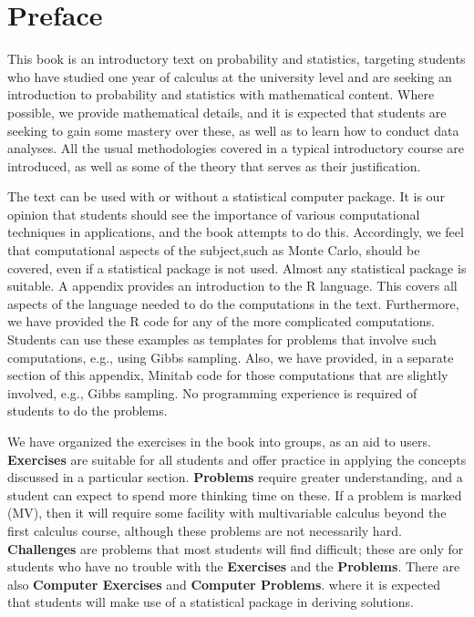\chapter{Preface}\label{preface}

This book is an introductory text on probability and statistics, targeting students who have studied one year of calculus at the university level and are seeking an introduction to probability and statistics with mathematical content. Where possible, we provide mathematical details, and it is expected that students are seeking to gain some mastery over these, as well as to learn how to conduct data analyses. All the usual methodologies covered in a typical introductory course are introduced, as well as some of the theory that serves as their justification.

The text can be used with or without a statistical computer package. It is our opinion that students should see the importance of various computational techniques in applications, and the book attempts to do this. Accordingly, we feel that computational
aspects of the subject,such as Monte Carlo, should be covered, even if a statistical package is not used. Almost any statistical package is suitable. A  appendix provides an introduction to the R language. This covers all aspects of the language needed to do the computations in the text. Furthermore, we have provided the R code for any of the more complicated computations. Students can use these examples as templates for problems that involve such computations, e.g., using Gibbs sampling. Also, we have provided, in a separate section of this appendix, Minitab code for those computations that are  slightly involved, e.g., Gibbs sampling. No programming experience is required of students to do the problems.

We have organized the exercises in the book into groups, as an aid to users. \textbf{Exercises} are suitable for all students and offer practice in applying the concepts discussed in a particular section.  \textbf{Problems} require greater understanding, and a student can expect to spend more thinking time on these. If a problem is marked (MV), then it will require some facility with multivariable calculus beyond the first calculus course, although these problems are not necessarily hard. \textbf{Challenges} are problems that most students will find difficult; these are only for students who have no trouble with the \textbf{Exercises} and the \textbf{Problems}. There are also \textbf{Computer Exercises} and \textbf{Computer Problems}. where it is expected that students will make use of a statistical package in deriving solutions.

